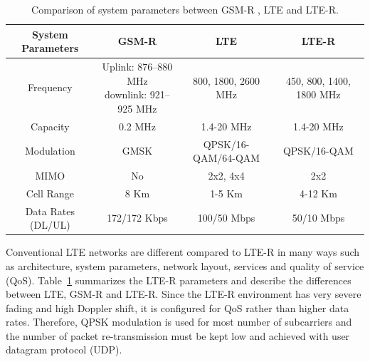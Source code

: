 \begin{table}[h!]
\caption{Comparison of system parameters between GSM-R , LTE and LTE-R.}
\begin{adjustbox}{width=1.22\textwidth, center=\textwidth}
\begin{tabular}{c | c | c | c}
\toprule
System Parameters & GSM-R & LTE & LTE-R\\ 
\midrule
Frequency & \shortstack{Uplink: 876--880 MHz\\downlink: 921--925 MHz} & 800, 1800, 2600 MHz & 450, 800, 1400, 1800 MHz \\  
Capacity  & 0.2 MHz & 1.4-20 MHz & 1.4-20 MHz\\ 
Modulation  & GMSK & QPSK/16-QAM/64-QAM & QPSK/16-QAM\\ 
MIMO  & No  & 2x2, 4x4  & 2x2\\ 
Cell Range  & 8 Km  & 1-5 Km & 4-12 Km \\ 
Data Rates (DL/UL)  & 172/172 Kbps  & 100/50 Mbps & 50/10 Mbps\\ 
\bottomrule
\end{tabular}
\end{adjustbox}
\label{ltertable}
\end{table}

Conventional LTE networks are different compared to LTE-R in many ways such as architecture, system parameters, network layout, services and quality of service (QoS). Table~\ref{ltertable} summarizes the LTE-R parameters and describe the differences between LTE, GSM-R and LTE-R. Since the LTE-R environment has very severe fading and high Doppler shift, it is configured for QoS rather than higher data rates. Therefore, QPSK modulation is used for most number of subcarriers and the number of packet re-transmission must be kept low and achieved with user datagram protocol (UDP).

